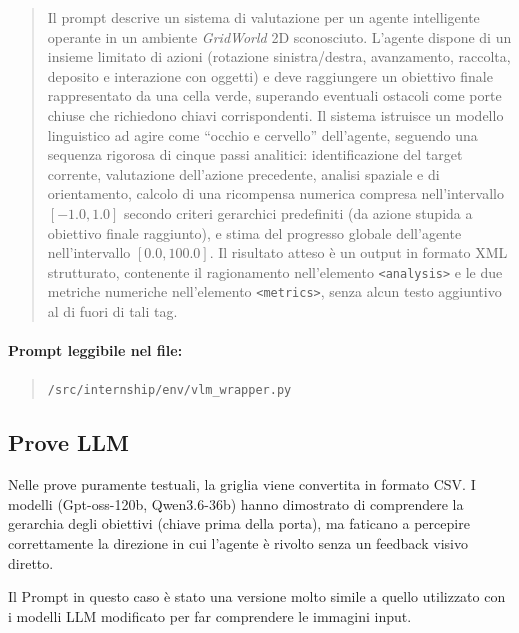 \documentclass[12pt,a4paper]{article}
\begin{document}
\begin{quote}
Il prompt descrive un sistema di valutazione per un agente intelligente operante in un ambiente \textit{GridWorld} 2D sconosciuto. L'agente dispone di un insieme limitato di azioni (rotazione sinistra/destra, avanzamento, raccolta, deposito e interazione con oggetti) e deve raggiungere un obiettivo finale rappresentato da una cella verde, superando eventuali ostacoli come porte chiuse che richiedono chiavi corrispondenti. Il sistema istruisce un modello linguistico ad agire come ``occhio e cervello'' dell'agente, seguendo una sequenza rigorosa di cinque passi analitici: identificazione del target corrente, valutazione dell'azione precedente, analisi spaziale e di orientamento, calcolo di una ricompensa numerica compresa nell'intervallo $[-1.0, 1.0]$ secondo criteri gerarchici predefiniti (da azione stupida a obiettivo finale raggiunto), e stima del progresso globale dell'agente nell'intervallo $[0.0, 100.0]$. Il risultato atteso è un output in formato XML strutturato, contenente il ragionamento nell'elemento \texttt{<analysis>} e le due metriche numeriche nell'elemento \texttt{<metrics>}, senza alcun testo aggiuntivo al di fuori di tali tag.
\end{quote}

\paragraph{Prompt leggibile nel file:}
\begin{quote}
    \texttt{/src/internship/env/vlm\_wrapper.py}
\end{quote}


\subsection{Prove LLM}
Nelle prove puramente testuali, la griglia viene convertita in formato CSV. I modelli (Gpt-oss-120b, Qwen3.6-36b) hanno dimostrato di comprendere la gerarchia degli obiettivi (chiave prima della porta), ma faticano a percepire correttamente la direzione in cui l'agente è rivolto senza un feedback visivo diretto.

Il Prompt in questo caso è stato una versione molto simile a quello utilizzato con i modelli LLM modificato per far comprendere le immagini input.
\end{document}
